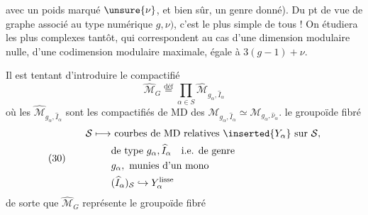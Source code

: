 avec un poids marqué $\unsure{\nu}$, et bien sûr, un genre donné). Du pt de vue  de graphe associé au type numérique $g,\nu)$, c'est le plus simple de tous ! On étudiera les plus complexes tantôt, qui correspondent au cas d'une dimension modulaire nulle,  d'une codimension modulaire maximale, égale à $3(g-1)+\nu$.

Il est tentant d'introduire le compactifié
\[
\widehat{\mathcal M}_G\overset{\mathrm{déf}}{=}\prod_{\alpha\in S}\widehat{\mathcal M}_{g_\alpha,\widehat I_\alpha}
\]
où les $\widehat{\mathcal M}_{g_\alpha,\widehat I_\alpha}$ sont les compactifiés de MD des $\mathcal M_{g_\alpha,\widehat I_\alpha}\simeq\mathcal M_{g_\alpha,\widehat\nu_\alpha}$.   le groupoïde fibré
\[
(30)\qquad\begin{aligned}
\mathcal S\longmapsto&\ \text{courbes de MD relatives }\inserted{Y_\alpha}\text{ sur }\mathcal S,\\
&\text{de type }g_\alpha,\widehat I_\alpha\quad\text{i.e. de genre}\\
&g_\alpha,\text{ munies d'un mono}\\
&(\widehat I_\alpha)_{\mathcal S}\hookrightarrow Y_\alpha^{\text{lisse}}
\end{aligned}
\]
de sorte que $\widehat{\mathcal M}_G$ représente le groupoïde fibré
